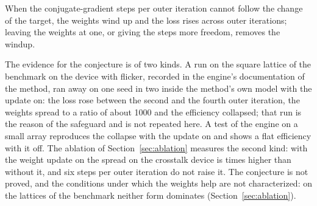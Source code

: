 \begin{conjecture}\label{conj:windup}
When the conjugate-gradient steps per outer iteration cannot follow the change of the target, the weights wind up and the loss rises across outer iterations; leaving the weights at one, or giving the steps more freedom, removes the windup.
\end{conjecture}
The evidence for the conjecture is of two kinds. A run on the square lattice of the benchmark on the device with flicker, recorded in the engine's documentation of the method, ran away on one seed in two inside the method's own model with the update on: the loss rose between the second and the fourth outer iteration, the weights spread to a ratio of about 1000 and the efficiency collapsed; that run is the reason of the safeguard and is not repeated here. A test of the engine on a small array reproduces the collapse with the update on and shows a flat efficiency with it off. The ablation of Section~\ref{sec:ablation} measures the second kind: with the weight update on the spread on the crosstalk device is \ablBWeightsRatio{} times higher than without it, and six steps per outer iteration do not raise it. The conjecture is not proved, and the conditions under which the weights help are not characterized: on the lattices of the benchmark neither form dominates (Section~\ref{sec:ablation}).
